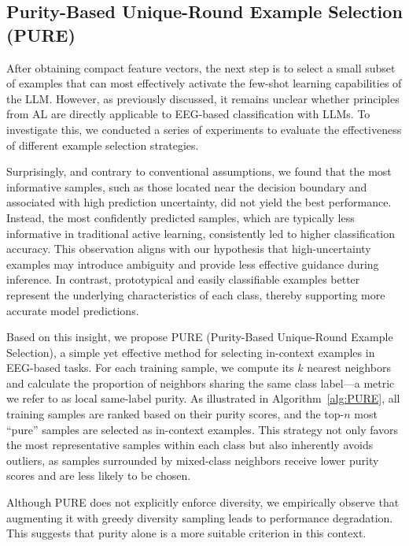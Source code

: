 \documentclass[journal,twocolumn]{IEEEtran}
\begin{document}
\subsection{Purity-Based Unique-Round Example Selection (PURE)}
\label{subsec:PURE}

After obtaining compact feature vectors, the next step is to select a small subset of examples that can most effectively activate the few-shot learning capabilities of the LLM. However, as previously discussed, it remains unclear whether principles from AL are directly applicable to EEG-based classification with LLMs. To investigate this, we conducted a series of experiments to evaluate the effectiveness of different example selection strategies.

Surprisingly, and contrary to conventional assumptions, we found that the most informative samples, such as those located near the decision boundary and associated with high prediction uncertainty, did not yield the best performance. Instead, the most confidently predicted samples, which are typically less informative in traditional active learning, consistently led to higher classification accuracy. This observation aligns with our hypothesis that high-uncertainty examples may introduce ambiguity and provide less effective guidance during inference. In contrast, prototypical and easily classifiable examples better represent the underlying characteristics of each class, thereby supporting more accurate model predictions.

Based on this insight, we propose PURE (Purity-Based Unique-Round Example Selection), a simple yet effective method for selecting in-context examples in EEG-based tasks. For each training sample, we compute its $k$ nearest neighbors and calculate the proportion of neighbors sharing the same class label—a metric we refer to as local same-label purity. As illustrated in Algorithm~\ref{alg:PURE}, all training samples are ranked based on their purity scores, and the top-$n$ most “pure” samples are selected as in-context examples. This strategy not only favors the most representative samples within each class but also inherently avoids outliers, as samples surrounded by mixed-class neighbors receive lower purity scores and are less likely to be chosen.

Although PURE does not explicitly enforce diversity, we empirically observe that augmenting it with greedy diversity sampling leads to performance degradation. This suggests that purity alone is a more suitable criterion in this context.
\end{document}
